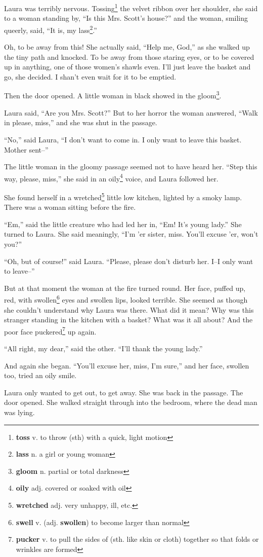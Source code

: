 Laura was terribly nervous. Tossing\footnote{\textbf{toss} v. to throw (sth) with a quick, light motion} the velvet ribbon over her shoulder, she said to a woman standing by, ``Is this Mrs. Scott's house?'' and the woman, smiling queerly, said, ``It is, my lass\footnote{\textbf{lass} n. a girl or young woman}.''

Oh, to be away from this! She actually said, ``Help me, God,'' as she walked up the tiny path and knocked. To be away from those staring eyes, or to be covered up in anything, one of those women's shawls even. I'll just leave the basket and go, she decided. I shan't even wait for it to be emptied.

Then the door opened. A little woman in black showed in the gloom\footnote{\textbf{gloom} n. partial or total darkness}.

Laura said, ``Are you Mrs. Scott?'' But to her horror the woman answered, ``Walk in please, miss,'' and she was shut in the passage.

``No,'' said Laura, ``I don't want to come in. I only want to leave this basket. Mother sent--''

The little woman in the gloomy passage seemed not to have heard her. ``Step this way, please, miss,'' she said in an oily\footnote{\textbf{oily} adj. covered or soaked with oil} voice, and Laura followed her.

She found herself in a wretched\footnote{\textbf{wretched} adj. very unhappy, ill, etc.} little low kitchen, lighted by a smoky lamp. There was a woman sitting before the fire.

``Em,'' said the little creature who had led her in, ``Em! It's young lady.'' She turned to Laura. She said meaningly, ``I'm 'er sister, miss. You'll excuse 'er, won't you?''

``Oh, but of course!'' said Laura. ``Please, please don't disturb her. I--I only want to leave--''

But at that moment the woman at the fire turned round. Her face, puffed up, red, with swollen\footnote{\textbf{swell} v. (adj. \textbf{swollen}) to become larger than normal} eyes and swollen lips, looked terrible. She seemed as though she couldn't understand why Laura was there. What did it mean? Why was this stranger standing in the kitchen with a basket? What was it all about? And the poor face puckered\footnote{\textbf{pucker} v. to pull the sides of (sth. like skin or cloth) together so that folds or wrinkles are formed} up again.

``All right, my dear,'' said the other. ``I'll thank the young lady.''

And again she began. ``You'll excuse her, miss, I'm sure,'' and her face, swollen too, tried an oily smile.

Laura only wanted to get out, to get away. She was back in the passage. The door opened. She walked straight through into the bedroom, where the dead man was lying.
